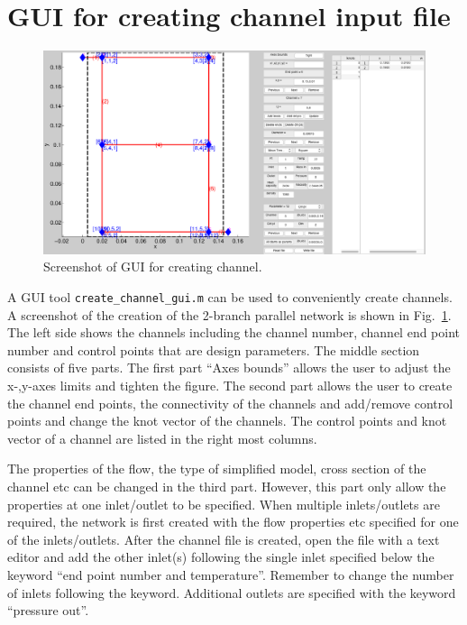 \documentclass[11pt,letterpaper]{article}
\begin{document}
\section{GUI for creating channel input file}
\begin{figure}[!h]
\centering
\includegraphics[width=\linewidth]{create_channel_gui_w_parallel2.eps}
\caption{Screenshot of GUI for creating channel. \label{fig_create_channel_gui}}
\end{figure}
A GUI tool \texttt{create\_channel\_gui.m} can be used to conveniently create channels. A screenshot of the creation of the 2-branch parallel network is shown in Fig.\ \ref{fig_create_channel_gui}. The left side shows the channels including the channel number, channel end point number and control points that are design parameters. The middle section consists of five parts. The first part ``Axes bounds'' allows the user to adjust the x-,y-axes limits and tighten the figure. The second part allows the user to create the channel end points, the connectivity of the channels and add/remove control points and change the knot vector of the channels. The control points and knot vector of a channel are listed in the right most columns. 

The properties of the flow, the type of simplified model, cross section of the channel etc can be changed in the third part. However, this part only allow the properties at one inlet/outlet to be specified. When multiple inlets/outlets are required, the network is first created with the flow properties etc specified for one of the inlets/outlets. After the channel file is created, open the file with a text editor and add the other inlet(s) following the single inlet specified below the keyword ``end point number and temperature''. Remember to change the number of inlets following the keyword. Additional outlets are specified with the keyword ``pressure out''. 
\end{document}
